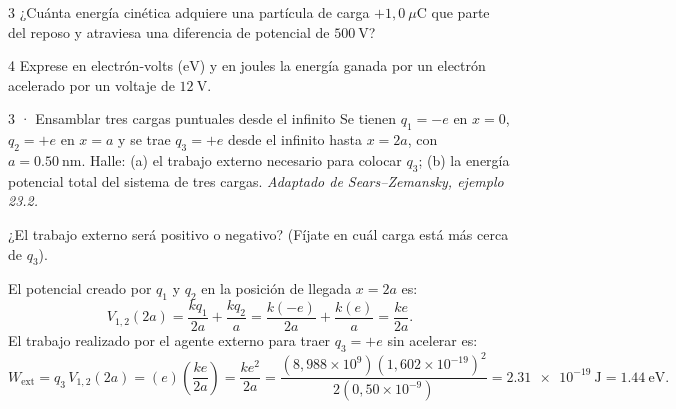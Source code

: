 \documentclass[11pt]{article}
\begin{document}
\begin{eReto}{3 }
¿Cuánta energía cinética adquiere una partícula de carga $+1{,}0\ \mu\mathrm{C}$ que parte del reposo y atraviesa una diferencia de potencial de $\SI{500}{\volt}$?
\end{eReto}

\begin{eReto}{4 }
Exprese en electrón-volts ($\mathrm{eV}$) y en joules la energía ganada por un electrón acelerado por un voltaje de $\SI{12}{\volt}$.
\end{eReto}


\begin{eResuelto}{3 · Ensamblar tres cargas puntuales desde el infinito}
Se tienen $q_1=-e$ en $x=0$, $q_2=+e$ en $x=a$ y se trae $q_3=+e$ desde el infinito hasta $x=2a$, con $a=\SI{0,50}{\nano\metre}$. Halle: (a) el trabajo externo necesario para colocar $q_3$; (b) la energía potencial total del sistema de tres cargas. \emph{Adaptado de Sears--Zemansky, ejemplo 23.2.}
\begin{center}
\end{center}
\begin{ePredice}¿El trabajo externo será positivo o negativo? (Fíjate en cuál carga está más cerca de $q_3$).\end{ePredice}
El potencial creado por $q_1$ y $q_2$ en la posición de llegada $x=2a$ es:
\[ V_{1,2}(2a) = \frac{kq_1}{2a} + \frac{kq_2}{a} = \frac{k(-e)}{2a} + \frac{k(e)}{a} = \frac{ke}{2a}. \]
El trabajo realizado por el agente externo para traer $q_3=+e$ sin acelerar es:
\[ W_{\text{ext}} = q_3\,V_{1,2}(2a) = (e)\left(\frac{ke}{2a}\right) = \frac{ke^2}{2a} = \frac{(8{,}988\times10^9)(1{,}602\times10^{-19})^2}{2(0{,}50\times10^{-9})} = \SI{2,31e-19}{\joule} = \SI{1,44}{\electronvolt}. \]

\end{eResuelto}
\end{document}

